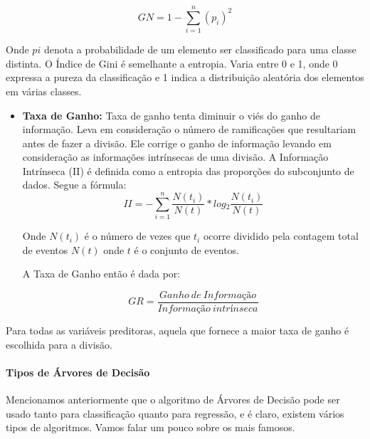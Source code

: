 \documentclass[
  letterpaper,
  DIV=11,
  numbers=noendperiod]{scrreprt}
\let\oldparagraph\paragraph
\renewcommand{\paragraph}[1]{\oldparagraph{#1}\mbox{}}
\begin{document}
\[
GN = 1- \sum_{i=1}^{n} (p_i)^2
\]

Onde \(pi\) denota a probabilidade de um elemento ser classificado para
uma classe distinta. O Índice de Gini é semelhante a entropia. Varia
entre 0 e 1, onde 0 expressa a pureza da classificação e 1 indica a
distribuição aleatória dos elementos em várias classes.

\begin{itemize}
\item
  \textbf{Taxa de Ganho:} Taxa de ganho tenta diminuir o viés do ganho
  de informação. Leva em consideração o número de ramificações que
  resultariam antes de fazer a divisão. Ele corrige o ganho de
  informação levando em consideração as informações intrínsecas de uma
  divisão. A Informação Intrínseca (II) é definida como a entropia das
  proporções do subconjunto de dados. Segue a fórmula: \[
  II = -\sum_{i=1}^n \frac{N(t_i)}{N(t)} *log{_2}  \frac{N(t_i)}{N(t)}
  \]

  Onde \(N(t_i)\) é o número de vezes que \(t_i\) ocorre dividido pela
  contagem total de eventos \(N(t)\) onde \(t\) é o conjunto de eventos.

  A Taxa de Ganho então é dada por:

  \[
  GR = \frac{Ganho\ de\ Informação}{Informação\ intrínseca}
  \]
\end{itemize}

Para todas as variáveis \hspace{0pt}\hspace{0pt}preditoras, aquela que
fornece a maior taxa de ganho é escolhida para a divisão.

\hypertarget{tipos-de-uxe1rvores-de-decisuxe3o}{%
\paragraph{Tipos de Árvores de
Decisão}\label{tipos-de-uxe1rvores-de-decisuxe3o}}

Mencionamos anteriormente que o algoritmo de Árvores de Decisão pode ser
usado tanto para classificação quanto para regressão, e é claro, existem
vários tipos de algoritmos. Vamos falar um pouco sobre os mais famosos.
\end{document}
